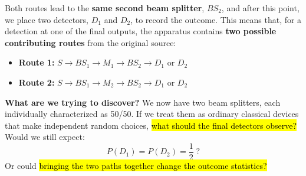 \begin{itemize}
        Both routes lead to the \textbf{same second beam splitter}, $BS_2$, and after this point, we place two detectors, $D_1$ and $D_2$, to record the outcome. This means that, for a detection at one of the final outputs, the apparatus contains \textbf{two possible contributing routes} from the original source:
        \begin{itemize}
            \item \textbf{Route 1:} $S\rightarrow BS_1\rightarrow M_1\rightarrow BS_2\rightarrow D_1$ or $D_2$
                \begin{figure}[H]
                    \centering
                \end{figure}
            \item \textbf{Route 2:} $S\rightarrow BS_1\rightarrow M_2\rightarrow BS_2\rightarrow D_1$ or $D_2$
                \begin{figure}[H]
                    \centering
                \end{figure}
        \end{itemize}
\end{itemize}
\textcolor{Green3}{ \textbf{What are we trying to discover?}} We now have two beam splitters, each individually characterized as 50/50. If we treat them as ordinary classical devices that make independent random choices, \hl{what should the final detectors observe?} Would we still expect:
\begin{equation*}
    P(D_1)=P(D_2)=\frac{1}{2} \;?
\end{equation*}
Or could \hl{bringing the two paths together change the outcome statistics?}

\newpage

